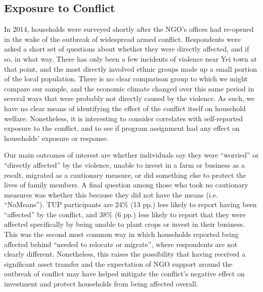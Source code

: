 \documentclass[12pt,article]{article}
\begin{document}
\subsection*{Exposure to Conflict}
\label{sec-3-7}

In 2014, households were surveyed shortly after the NGO's offices had re-opened in
the wake of the outbreak of widespread armed conflict. Respondents were asked a short
set of questions about whether they were directly affected, and if so, in what way.
There has only been a few incidents of violence near Yei town at that point, and the most
directly involved ethnic groups made up a small portion of the local population. There
is no clear comparison group to which we might compare our sample, and the economic
climate changed over this same period in several ways that were probably not directly
caused by the violence. As such, we have no clear means of identifying the effect of
the conflict itself on household welfare. Nonetheless, it is interesting to consider
correlates with self-reported exposure to the conflict, and to see if program
assignment had any effect on households' exposure or response.

Our main outcomes of interest are whether individuals say they were ``worried'' or
``directly affected'' by the violence, unable to invest in a farm or business as a
result, migrated as a cautionary measure, or did something else to protect the lives
of family members. A final question among those who took no cautionary measures was
whether this because they did not have the means (i.e. ``NoMeans''). TUP participants
are 24\% (13 pp.) less likely to report having been ``affected'' by the conflict, and
38\% (6 pp.) less likely to report that they were affected specifically by being
unable to plant crops or invest in their business. This was the second most common
way in which households reported being affected behind ``needed to relocate or
migrate'', where respondents are not clearly different. Nonetheless, this raises the
possibility that having received a significant asset transfer and the expectation of
NGO support around the outbreak of
conflict may have helped mitigate the conflict's negative effect on investment and
protect households from being affected overall.

\newpage
\end{document}
